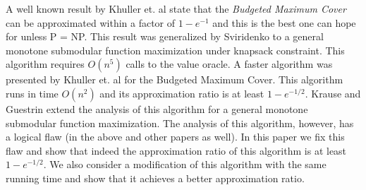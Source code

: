 A well known result by Khuller et. al state that the \emph{Budgeted Maximum Cover}
can be approximated within a factor of $1-e^{-1}$ and this is the best one can hope for unless 
P = NP.
This result was generalized by Sviridenko to a general monotone submodular function maximization
under knapsack constraint. 
This algorithm requires $O(n^5)$ calls to the value oracle.
A faster algorithm was presented by Khuller et. al for the Budgeted Maximum Cover.  
This algorithm runs in time $O(n^2)$ and its approximation ratio is at least $1-e^{-1/2}$.
Krause and Guestrin extend the analysis of this algorithm
for a general monotone submodular function maximization. 
The analysis of this algorithm, however, has a logical flaw 
(in the above and other papers as well). 
In this paper we fix this flaw and show that indeed the approximation ratio of this
algorithm is at least $1-e^{-1/2}$. 
We also consider a modification of this algorithm with 
the same running time and show that it achieves a better approximation ratio.  
  

